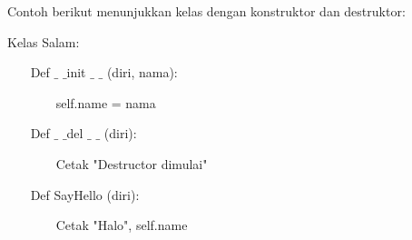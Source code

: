 Contoh berikut menunjukkan kelas dengan konstruktor dan destruktor: \par
\vspace{12pt}
\vspace{12pt}
Kelas Salam: \par
~~~ Def  $  \_  $ $  \_  $init  $  \_  $ $  \_  $ (diri, nama): \par
~~~~~~~ self.name = nama \par
~~~ Def  $  \_  $ $  \_  $del  $  \_  $ $  \_  $ (diri): \par
~~~~~~~ Cetak "Destructor dimulai" \par
~~~ Def SayHello (diri): \par
~~~~~~~ Cetak "Halo", self.name \par
\vspace{12pt}

